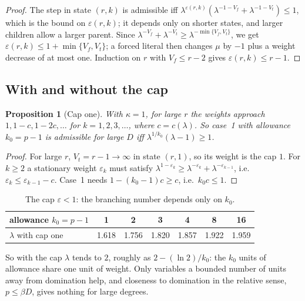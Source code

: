 \documentclass[11pt,a4paper]{article}
\newtheorem{proposition}[theorem]{Proposition}
\theoremstyle{remark}
\begin{document}
\begin{proof}
The step in state $(r,k)$ is admissible iff
$\lambda^{\varepsilon(r,k)}(\lambda^{-1-V_f}+\lambda^{-1-V_t})\le1$, which is the
bound on $\varepsilon(r,k)$; it depends only on shorter states, and larger
children allow a larger parent. Since $\lambda^{-V_f}+\lambda^{-V_t}\ge
\lambda^{-\min\{V_f,V_t\}}$, we get $\varepsilon(r,k)\le1+\min\{V_f,V_t\}$; a
forced literal then changes $\mu$ by $-1$ plus a weight decrease of at most
one. Induction on $r$ with $V_f\le r-2$ gives $\varepsilon(r,k)\le r-1$.
\end{proof}

\subsection{With and without the cap}

\begin{proposition}[Cap one]\label{prop:cap}
With $\kappa=1$, for large $r$ the weights approach $1,1-c,1-2c,\dots$ for
$k=1,2,3,\dots$, where $c=c(\lambda)$. So case~1 with allowance $k_0=p-1$ is
admissible for large $D$ iff $\lambda^{1/k_0}(\lambda-1)\ge1$.
\end{proposition}

\begin{proof}
For large $r$, $V_t=r-1\to\infty$ in state $(r,1)$, so its weight is the cap
$1$. For $k\ge2$ a stationary weight $\varepsilon_k$ must satisfy
$\lambda^{1-\varepsilon_k}\ge\lambda^{-\varepsilon_k}+\lambda^{-\varepsilon_{k-1}}$,
i.e.\ $\varepsilon_k\le\varepsilon_{k-1}-c$. Case~1 needs
$1-(k_0-1)c\ge c$, i.e.\ $k_0c\le1$.
\end{proof}

\begin{table}[ht]
\centering
\begin{tabular}{lcccccc}
\toprule
allowance $k_0=p-1$ & 1 & 2 & 3 & 4 & 8 & 16\\
\midrule
$\lambda$ with cap one & 1.618 & 1.756 & 1.820 & 1.857 & 1.922 & 1.959\\
\bottomrule
\end{tabular}
\caption{The cap $\varepsilon<1$: the branching number depends only on $k_0$.}
\label{tab:cap}
\end{table}

So with the cap $\lambda$ tends to $2$, roughly as $2-(\ln2)/k_0$: the $k_0$
units of allowance share one unit of weight. Only variables a bounded number of units away from
domination help, and closeness to domination in the relative sense,
$p\le\beta D$, gives nothing for large degrees.
\end{document}
